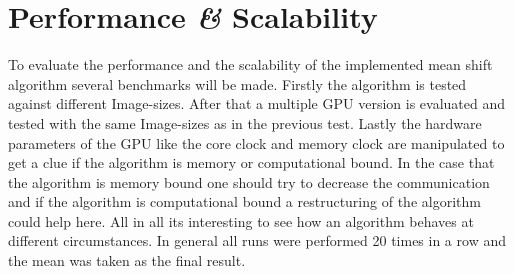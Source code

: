 \chapter{Performance {\itshape{\&}} Scalability} %
\label{cha:performance_and_scalability_}


To evaluate the performance and the scalability of the implemented mean shift
algorithm several benchmarks will be made. Firstly the algorithm is tested 
against different Image-sizes. After that a multiple \gls{GPU} version is 
evaluated and tested with the same Image-sizes as in the previous test. Lastly
the hardware parameters of the \gls{GPU} like the core clock and memory clock
are manipulated to get a clue if the algorithm is memory or computational bound. 
In the case that the algorithm is memory bound one should try to decrease the
communication and if the algorithm is computational bound a restructuring of 
the algorithm could help here. All in all its interesting to see how an algorithm
behaves at different circumstances. In general all runs were performed 20 times
in a row and the mean was taken as the final result.

